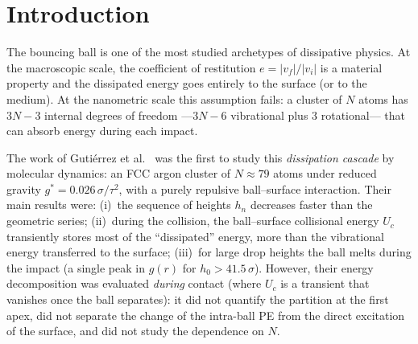\documentclass[aps,pre,twocolumn,reprint,superscriptaddress]{revtex4-2}
\newcommand{\cor}{e}
\newcommand{\gstar}{g^*}
\begin{document}
\begin{abstract}
In long simulations ($5000\,\tau$, $N=79$, $h_0=28\,\sigma$), the first
bounce height is well approximated by the scale
$h_1\approx T_B/(Mg)=8.3\,\sigma$ proposed here (ratio $=0.96$), but the
system does not converge to that attractor: the CM height decays faster
than $T_B$, and after 23 bounces ($t\approx660\,\tau$) the ball remains
trapped over the surface with $h_n\lesssim1\,\sigma$.

With the full LJ interaction ($c_{ps}=1$, adhesion), the ball sticks in all
$4N\times6h_0=24$ studied cases ($v$ up to $2.0\,\sigma/\tau$). The adhesion
energy $E_{\rm adh}\propto N^{0.73}$ (contact area) exceeds in every case
the CM energy available after the bounce; an order-of-magnitude
extrapolation places the threshold at $h_0^*(N)\sim260$--$440\,\sigma$ with
$h_0^*\propto N^{-0.27}$.
\end{abstract}


\maketitle

\section{Introduction}
\label{sec:intro}

The bouncing ball is one of the most studied archetypes of dissipative
physics. At the macroscopic scale, the coefficient of restitution
$\cor = |v_f|/|v_i|$ is a material property and the dissipated energy goes
entirely to the surface (or to the medium). At the nanometric scale this
assumption fails: a cluster of $N$ atoms has $3N-3$ internal degrees of
freedom ---$3N-6$ vibrational plus 3 rotational--- that can absorb energy
during each impact.

The work of Gutiérrez et al.~\cite{Gutierrez2012} was the first to study
this \emph{dissipation cascade} by molecular dynamics: an FCC argon cluster
of $N\approx79$ atoms under reduced gravity
$\gstar=0.026\,\sigma/\tau^2$, with a purely repulsive ball--surface
interaction. Their main results were: (i)~the sequence of heights $h_n$
decreases faster than the geometric series; (ii)~during the collision, the
ball--surface collisional energy $U_c$ transiently stores most of the
``dissipated'' energy, more than the vibrational energy transferred to the
surface; (iii)~for large drop heights the ball melts during the impact
(a single peak in $g(r)$ for $h_0>41.5\,\sigma$).
However, their energy decomposition was evaluated \emph{during} contact
(where $U_c$ is a transient that vanishes once the ball separates): it did
not quantify the partition at the first apex, did not separate the change
of the intra-ball PE from the direct excitation of the surface, and did not
study the dependence on $N$.
\end{document}
